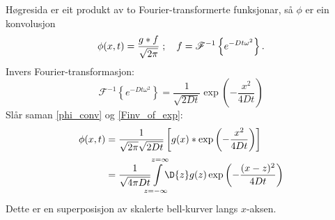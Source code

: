 \documentclass[12pt]{article}
\begin{document}
\begin{multicols*}{2}
\[    \]
    Høgresida er eit produkt av to Fourier-transformerte funksjonar,
    så $\phi$ er ein konvolusjon
    \begin{equation}
        \label{phi_conv}
        \phi(x, t) = \frac{g * f}{\sqrt{2\pi}} \;;\quad
        f = \mathscr F^{-1}\left\{e^{-Dt\omega^2}\right\}
             \text.
    \end{equation}
    Invers Fourier-transformasjon:
    \begin{equation}
        \label{Finv_of_exp}
        \mathscr F^{-1}\left\{e^{-Dt\omega^2}\right\}
        = \frac{1}{\sqrt{2Dt}} \exp \left( -\frac{x^2}{4Dt} \right)
    \end{equation}
    Slår saman \eqref{phi_conv} og \eqref{Finv_of_exp}:
    \begin{equation}
        \begin{split}
            \phi(x, t) &= \frac{1}{\sqrt{2\pi} \sqrt{2 D t}}
            \left[
                g(x) * \exp \left( -\frac{x^2}{4Dt} \right)
            \right] \\
                       &= \frac{1}{\sqrt{4 \pi D t}}
                       \smashoperator{\int\limits_{z = -\infty\mathstrut}^{z = \infty\mathstrut}}
                       \D{z} g(z)
                       \exp \left( -\frac{(x - z)^2}{4Dt} \right)
        \end{split}
    \end{equation}
    Dette er en superposisjon av skalerte bell-kurver langs $x$-aksen.

\end{multicols*}
\end{document}
